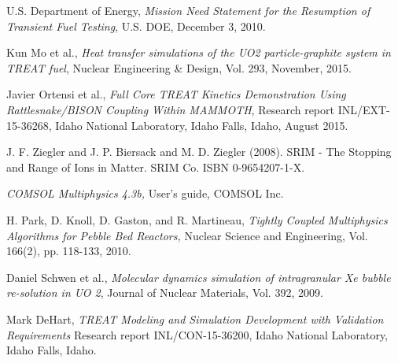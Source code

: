 \documentclass{anstrans}
\begin{document}
\begin{thebibliography}{1}

 U.S. Department of Energy, {\em Mission Need Statement for the Resumption of Transient Fuel Testing}, U.S. DOE, December 3, 2010. 

 Kun Mo et al., {\em Heat transfer simulations of the UO2 particle-graphite system in TREAT fuel}, Nuclear Engineering \& Design, Vol. 293, November, 2015. 

 Javier Ortensi et al.,  {\em Full Core TREAT Kinetics Demonstration Using Rattlesnake/BISON Coupling Within MAMMOTH}, Research report INL/EXT-15-36268, Idaho National Laboratory, Idaho Falls, Idaho, August 2015.


 J. F. Ziegler and J. P. Biersack and M. D. Ziegler (2008). SRIM - The Stopping and Range of Ions in Matter. SRIM Co. ISBN 0-9654207-1-X.

 {\em COMSOL Multiphysics 4.3b,} User's guide, COMSOL Inc.

 H. Park, D. Knoll, D. Gaston, and R. Martineau, {\em Tightly Coupled Multiphysics Algorithms for Pebble Bed Reactors,} Nuclear Science and Engineering, Vol. 166(2), pp. 118-133, 2010.

 Daniel Schwen et al., {\em Molecular dynamics simulation of intragranular Xe bubble re-solution in UO 2}, Journal of Nuclear Materials, Vol. 392, 2009.

 Mark DeHart, {\em TREAT Modeling and Simulation Development with Validation Requirements} Research report INL/CON-15-36200, Idaho National Laboratory, Idaho Falls, Idaho.

%


\end{thebibliography}
\end{document}
